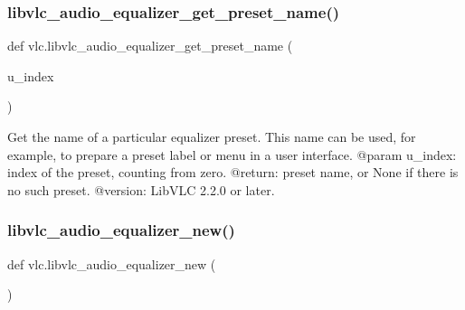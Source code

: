 \subsubsection{\texorpdfstring{libvlc\+\_\+audio\+\_\+equalizer\+\_\+get\+\_\+preset\+\_\+name()}{libvlc\_audio\_equalizer\_get\_preset\_name()}}
{\footnotesize\ttfamily def vlc.\+libvlc\+\_\+audio\+\_\+equalizer\+\_\+get\+\_\+preset\+\_\+name (\begin{DoxyParamCaption}\item[{}]{u\+\_\+index }\end{DoxyParamCaption})}

\begin{DoxyVerb}Get the name of a particular equalizer preset.
This name can be used, for example, to prepare a preset label or menu in a user
interface.
@param u_index: index of the preset, counting from zero.
@return: preset name, or None if there is no such preset.
@version: LibVLC 2.2.0 or later.
\end{DoxyVerb}
 \mbox{\label{namespacevlc_a12209b15e0da9a0481e4f7571f617dda}} 
\subsubsection{\texorpdfstring{libvlc\+\_\+audio\+\_\+equalizer\+\_\+new()}{libvlc\_audio\_equalizer\_new()}}
{\footnotesize\ttfamily def vlc.\+libvlc\+\_\+audio\+\_\+equalizer\+\_\+new (\begin{DoxyParamCaption}{ }\end{DoxyParamCaption})}

